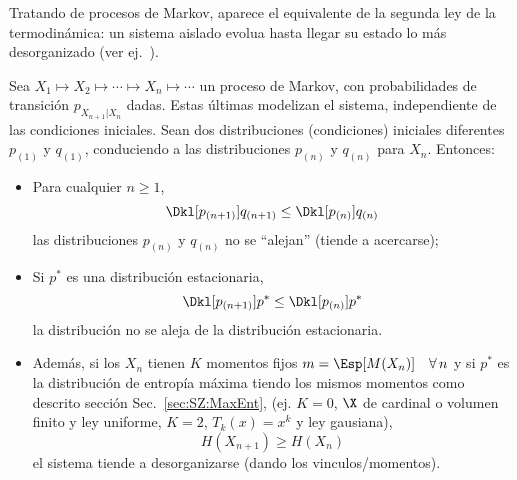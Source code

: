 
Tratando de procesos  de Markov, aparece el equivalente de la  segunda ley de la
termodin\'amica:  un sistema  aislado evolua  hasta  llegar su  estado lo  m\'as
desorganizado (ver ej.~\cite[y ref.]{CovTho06, Mer10, Mer18}).

\begin{lema}
  Sea $X_1 \mapsto X_2 \mapsto \cdots  \mapsto X_n \mapsto \cdots$ un proceso de
  Markov,  con probabilidades  de transici\'on  $p_{X_{n+1}|X_n}$  dadas.  Estas
  \'ultimas modelizan  el sistema,  independiente de las  condiciones iniciales.
  Sean  dos  distribuciones   (condiciones)  iniciales  diferentes  $p_{(1)}$  y
  $q_{(1)}$,  conduciendo  a  las  distribuciones  $p_{(n)}$  y  $q_{(n)}$  para
  $X_n$. Entonces:
%
\begin{itemize}
\item  Para cualquier  $n \ge  1$,
  \[
  \Dkl[p_{(n+1)}]{q_{(n+1)}} \le \Dkl[p_{(n)}]{q_{(n)}}
  \]
  las  distribuciones   $p_{(n)}$  y  $q_{(n)}$  no  se   ``alejan''  (tiende  a
  acercarse);
%
\item  Si  $p^*$  es  una  distribuci\'on  estacionaria,
  \[
  \Dkl[p_{(n+1)}]{p^*} \le \Dkl[p_{(n)}]{p^*}
  \]
  la distribuci\'on no se aleja de la distribuci\'on estacionaria.
%
\item Adem\'as, si  los $X_n$ tienen $K$ momentos fijos  $m = \Esp[M(X_n)] \quad
  \forall \,  n$ y si $p^*$  es la distribuci\'on de  entrop\'ia m\'axima tiendo
  los mismos momentos como  descrito secci\'on Sec.~\ref{sec:SZ:MaxEnt}, (ej. $K
  = 0$,  $\X$ de cardinal o  volumen finito y ley  uniforme, $K =  2$, $T_k(x) =
  x^k$ y ley gausiana),
  \[
  H(X_{n+1}) \ge H(X_n)
  \]
  el  sistema   tiende  a  desorganizarse (dando los vinculos/momentos).
\end{itemize}
\end{lema}
%
